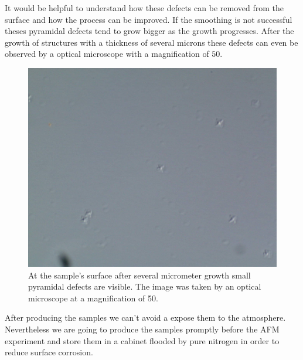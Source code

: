 It would be helpful to understand how these defects can be removed from the surface and how the process can be improved. If the smoothing is not successful theses pyramidal defects tend to grow bigger as the growth progresses. After the growth of structures with a thickness of several microns these defects can even be observed by a optical microscope with a magnification of $50$.
\begin{figure}
  \includegraphics[width=\linewidth]{Bilder/A2749_50_1}
  \caption{At the sample's surface after several micrometer growth small pyramidal defects are visible. The image was taken by an optical microscope at a magnification of 50.}
  \label{bandluecke}
\end{figure}

After producing the samples we can't avoid a expose them to the atmosphere. Nevertheless we are going to produce the samples promptly before the AFM experiment and store them in a cabinet flooded by pure nitrogen in order to reduce surface corrosion.



%
%	
%

